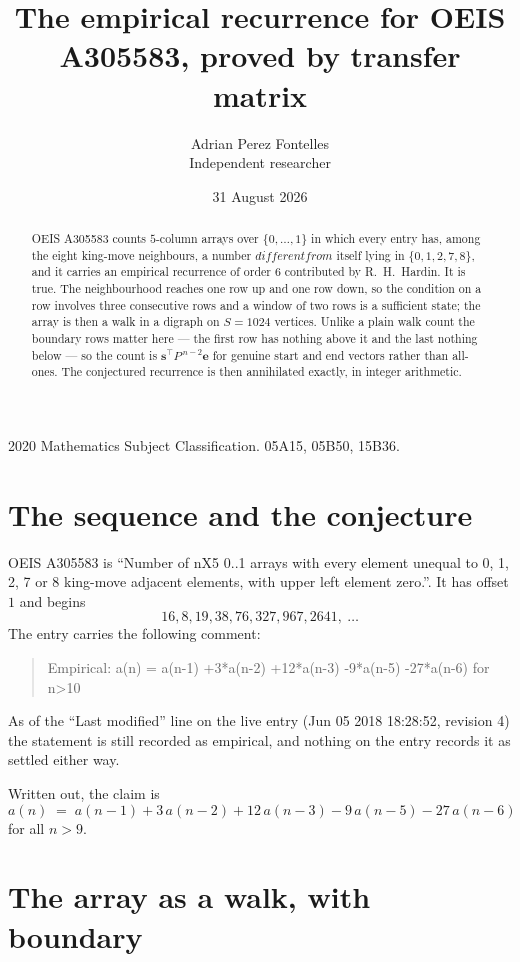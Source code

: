 \documentclass[11pt,a4paper]{article}
\title{The empirical recurrence for OEIS A305583, proved by transfer matrix}
\author{Adrian Perez Fontelles\\ \small Independent researcher}
\date{31 August 2026}
\theoremstyle{plain}
\theoremstyle{definition}
\begin{document}
\maketitle

\begin{abstract}
OEIS A305583 counts $5$-column arrays over $\{0,\dots,1\}$ in which every entry has,
among the eight king-move neighbours, a number $different from$ itself lying in $\{0,1,2,7,8\}$, and it carries an empirical
recurrence of order $6$ contributed by R.~H.~Hardin. It is true. The neighbourhood
reaches one row up and one row down, so the condition on a row involves three consecutive
rows and a window of two rows is a sufficient state; the array is then a walk in a digraph
on $S=1024$ vertices. Unlike a plain walk count the boundary rows matter here --- the first
row has nothing above it and the last nothing below --- so the count is
$\mathbf{s}^{\!\top}P^{\,n-2}\mathbf{e}$ for genuine start and end vectors rather than
all-ones. The conjectured recurrence is then annihilated exactly, in integer arithmetic.
\end{abstract}

\noindent\small 2020 Mathematics Subject Classification. 05A15, 05B50, 15B36.\normalsize

\section{The sequence and the conjecture}

OEIS A305583 is ``Number of nX5 0..1 arrays with every element unequal to 0, 1, 2, 7 or 8 king-move adjacent elements, with upper left element zero.''. It has offset
$1$ and begins
\[
16, 8, 19, 38, 76, 327, 967, 2641,\ \dots
\]
The entry carries the following comment:
\begin{quote}\small
Empirical: a(n) = a(n-1) +3*a(n-2) +12*a(n-3) -9*a(n-5) -27*a(n-6) for n>10
\end{quote}
As of the ``Last modified'' line on the live entry (Jun 05 2018 18:28:52, revision
4) the statement is still recorded as empirical, and nothing on the entry
records it as settled either way.

Written out, the claim is
\begin{equation}\label{eq:conj}
a(n)\;=\;a(n-1) + 3\,a(n-2) + 12\,a(n-3) - 9\,a(n-5) - 27\,a(n-6)
\end{equation}
for all $n>9$.

\section{The array as a walk, with boundary}
\end{document}
